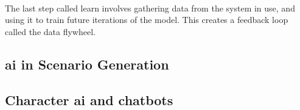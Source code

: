 \paragraph{}The last step called learn involves gathering data from the system in use, and using it to train future iterations of the model. This creates a feedback loop called the data flywheel.

\subsection{\acrshort{ai} in Scenario Generation}

\paragraph{}

\subsection{Character \acrshort{ai} and chatbots}